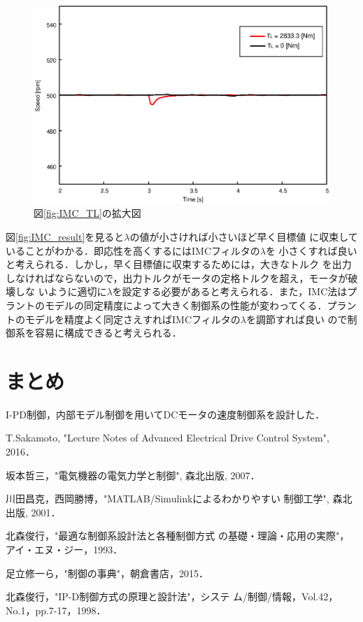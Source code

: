 \documentclass[a4paper,12pt]{jarticle}
\begin{document}
%
%
\begin{figure}[tbp]
 \begin{center}
  \includegraphics[width = 150mm]{fig/IMC_TLb.eps}
 \end{center}
 \caption{図\ref{fig:IMC_TL}の拡大図}
 \label{fig:IMC_TLb}
\end{figure}
%
図\ref{fig:IMC_result}を見ると$\lambda$の値が小さければ小さいほど早く目標値
に収束していることがわかる．即応性を高くするにはIMCフィルタの$\lambda$を
小さくすれば良いと考えられる．しかし，早く目標値に収束するためには，大きなトルク
を出力しなければならないので，出力トルクがモータの定格トルクを超え，モータが破壊しな
いように適切に$\lambda$を設定する必要があると考えられる．また，IMC法はプ
ラントのモデルの同定精度によって大きく制御系の性能が変わってくる．プラン
トのモデルを精度よく同定さえすればIMCフィルタの$\lambda$を調節すれば良い
ので制御系を容易に構成できると考えられる．
%
\section{まとめ}
I-PD制御，内部モデル制御を用いてDCモータの速度制御系を設計した．
%
\begin{thebibliography}{99}

  T.Sakamoto,
		 "Lecture Notes of Advanced Electrical Drive Control System",
		 2016．

  坂本哲三，"電気機器の電気力学と制御", 森北出版, 2007．

  川田昌克，西岡勝博，"MATLAB/Simulinkによるわかりやすい
		 制御工学", 森北出版, 2001．

  北森俊行，"最適な制御系設計法と各種制御方式
		 の基礎・理論・応用の実際"，アイ・エヌ・ジー，1993．

 足立修一ら，"制御の事典"，朝倉書店，2015．

  北森俊行，"IP-D制御方式の原理と設計法"，システ
		 ム/制御/情報，Vol.42，No.1，pp.7-17，1998．
		 
\end{thebibliography}
\end{document}
